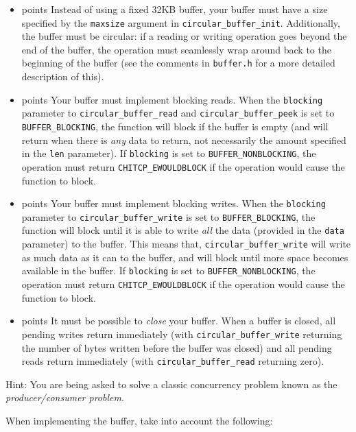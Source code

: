 \documentclass[10pt]{article}
\newcommand{\points}[1]{{\sffamily\mdseries\guillemotleft #1 points\guillemotright{}}}
\begin{document}
\begin{itemize}
 \item \points{10} Instead of using a fixed 32KB buffer, your buffer must have a size specified by the \texttt{maxsize} argument in \texttt{circular\_buffer\_init}. Additionally, the buffer must be circular: if a reading or writing operation goes beyond the end of the buffer, the operation must seamlessly wrap around back to the beginning of the buffer (see the comments in \texttt{buffer.h} for a more detailed description of this).
 
 \item \points{20} Your buffer must implement blocking reads. When the \texttt{blocking} parameter to \texttt{circular\_buffer\_read} and \texttt{circular\_buffer\_peek} is set to \texttt{BUFFER\_BLOCKING}, the function will block if the buffer is empty (and will return when there is \emph{any} data to return, not necessarily the amount specified in the \texttt{len} parameter). If \texttt{blocking} is set to \texttt{BUFFER\_NONBLOCKING}, the operation must return \texttt{CHITCP\_EWOULDBLOCK} if the operation would cause the function to block.
 
 \item \points{20} Your buffer must implement blocking writes. When the \texttt{blocking} parameter to \texttt{circular\_buffer\_write} is set to \texttt{BUFFER\_BLOCKING}, the function will block until it is able to write \emph{all} the data (provided in the \texttt{data} parameter) to the buffer. This means that, \texttt{circular\_buffer\_write} will write as much data as it can to the buffer, and will block until more space becomes available in the buffer. If  \texttt{blocking} is set to \texttt{BUFFER\_NONBLOCKING}, the operation must return \texttt{CHITCP\_EWOULDBLOCK} if the operation would cause the function to block.
 
 \item \points{10} It must be possible to \emph{close} your buffer. When a buffer is closed, all pending writes return immediately (with \texttt{circular\_buffer\_write} returning the number of bytes written before the buffer was closed) and all pending reads return immediately (with \texttt{circular\_buffer\_read} returning zero).
\end{itemize}

Hint: You are being asked to solve a classic concurrency problem known as the \emph{producer/consumer problem}.

When implementing the buffer, take into account the following:
\end{document}

